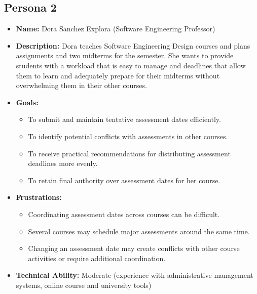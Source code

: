 \documentclass[12pt]{article}
\begin{document}
\subsection{Persona 2}
\begin{itemize}
\item \textbf{Name:} Dora Sanchez Explora (Software Engineering Professor)
\item \textbf{Description:} Dora teaches Software Engineering Design courses and plans 
assignments and two midterms for the semester. She wants to provide students with a workload 
that is easy to manage and deadlines that allow them to learn and adequately prepare 
for their midterms without overwhelming them in their other courses.
\item \textbf{Goals:}
\begin{itemize}
  \item To submit and maintain tentative assessment dates efficiently.
  \item To identify potential conflicts with assessments in other courses.
  \item To receive practical recommendations for distributing assessment deadlines more evenly.
  \item To retain final authority over assessment dates for her course.
\end{itemize}
\item \textbf{Frustrations:}
\begin{itemize}
  \item Coordinating assessment dates across courses can be difficult.
  \item Several courses may schedule major assessments around the same time.
  \item Changing an assessment date may create conflicts with other course activities or require additional coordination.
\end{itemize}
\item \textbf{Technical Ability:} Moderate (experience with administrative management systems, online course and university tools)
\end{itemize}
\end{document}
